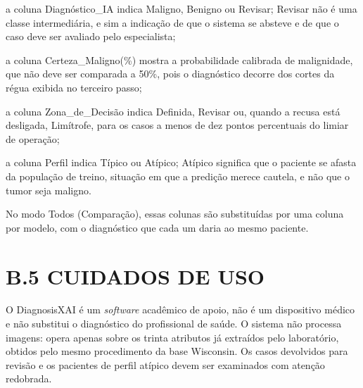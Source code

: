 \begin{alineas}
    \item a coluna Diagnóstico\_IA indica Maligno, Benigno ou Revisar; Revisar
          não é uma classe intermediária, e sim a indicação de que o sistema se
          absteve e de que o caso deve ser avaliado pelo especialista;
    \item a coluna Certeza\_Maligno(\%) mostra a probabilidade calibrada de
          malignidade, que não deve ser comparada a 50\%, pois o diagnóstico
          decorre dos cortes da régua exibida no terceiro passo;
    \item a coluna Zona\_de\_Decisão indica Definida, Revisar ou, quando a
          recusa está desligada, Limítrofe, para os casos a menos de dez pontos
          percentuais do limiar de operação;
    \item a coluna Perfil indica Típico ou Atípico; Atípico significa que o
          paciente se afasta da população de treino, situação em que a
          predição merece cautela, e não que o tumor seja maligno.
\end{alineas}

No modo Todos (Comparação), essas colunas são substituídas por uma coluna por
modelo, com o diagnóstico que cada um daria ao mesmo paciente.

\section*{B.5 CUIDADOS DE USO}

O DiagnosisXAI é um \textit{software} acadêmico de apoio, não é um dispositivo
médico e não substitui o diagnóstico do profissional de saúde. O sistema não
processa imagens: opera apenas sobre os trinta atributos já extraídos pelo
laboratório, obtidos pelo mesmo procedimento da base Wisconsin. Os casos
devolvidos para revisão e os pacientes de perfil atípico devem ser examinados
com atenção redobrada.
